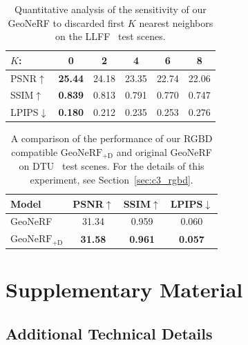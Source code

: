 \begin{table}[!t]
	\begin{center}
		\begin{tabular}{lccccc}
			\hline
			$K$: & 0 & 2 & 4 & 6 & 8\\
			\hline
			PSNR$\uparrow$ & \textbf{25.44} & 24.18 & 23.35 & 22.74 & 22.06 \\
			SSIM$\uparrow$ & \textbf{0.839} & 0.813 & 0.791 & 0.770 & 0.747 \\
			LPIPS$\downarrow$ & \textbf{0.180} & 0.212 & 0.235 & 0.253 & 0.276 \\
			\hline
		\end{tabular}
	\end{center}
	\caption{Quantitative analysis of the sensitivity of our GeoNeRF to discarded first $K$ nearest neighbors on the LLFF~\citep{mildenhall2019llff} test scenes.}
	\label{table:discard_views}
\end{table}

\begin{table}[!t]
\begin{center}
        \begin{tabular}{l|ccc}
        \hline
        Model & PSNR$\uparrow$ & SSIM$\uparrow$ & LPIPS$\downarrow$  \\
        \hline
        GeoNeRF & 31.34 & 0.959 & 0.060  \\
        $\text{GeoNeRF}_{\text{+D}}$  & \textbf{31.58} & \textbf{0.961} & \textbf{0.057} \\
        \hline
        \end{tabular}
    \end{center}
    \caption{A comparison of the performance of our RGBD compatible $\text{GeoNeRF}_{\text{+D}}$ and original GeoNeRF on DTU~\citep{jensen2014large} test scenes. For the details of this experiment, see Section~\ref{sec:c3_rgbd}.}
    \label{table:rgbd}
\end{table}

\FloatBarrier
\clearpage

\section{Supplementary Material} \label{sec:c3_supp}

\subsection{Additional Technical Details} \label{sec:c3_supp_details}

